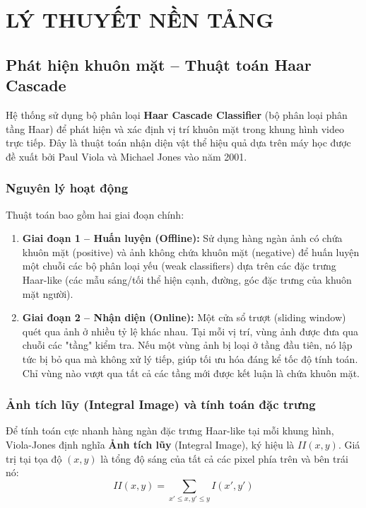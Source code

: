 \documentclass[12pt,a4paper]{article}
\begin{document}
\newpage

\section{LÝ THUYẾT NỀN TẢNG}

\subsection{Phát hiện khuôn mặt – Thuật toán Haar Cascade}
Hệ thống sử dụng bộ phân loại \textbf{Haar Cascade Classifier} (bộ phân loại phân tầng Haar) để phát hiện và xác định vị trí khuôn mặt trong khung hình video trực tiếp. Đây là thuật toán nhận diện vật thể hiệu quả dựa trên máy học được đề xuất bởi Paul Viola và Michael Jones vào năm 2001.

\subsubsection{Nguyên lý hoạt động}
Thuật toán bao gồm hai giai đoạn chính:
\begin{enumerate}
    \item \textbf{Giai đoạn 1 – Huấn luyện (Offline):} Sử dụng hàng ngàn ảnh có chứa khuôn mặt (positive) và ảnh không chứa khuôn mặt (negative) để huấn luyện một chuỗi các bộ phân loại yếu (weak classifiers) dựa trên các đặc trưng Haar-like (các mẫu sáng/tối thể hiện cạnh, đường, góc đặc trưng của khuôn mặt người).
    \item \textbf{Giai đoạn 2 – Nhận diện (Online):} Một cửa sổ trượt (sliding window) quét qua ảnh ở nhiều tỷ lệ khác nhau. Tại mỗi vị trí, vùng ảnh được đưa qua chuỗi các "tầng" kiểm tra. Nếu một vùng ảnh bị loại ở tầng đầu tiên, nó lập tức bị bỏ qua mà không xử lý tiếp, giúp tối ưu hóa đáng kể tốc độ tính toán. Chỉ vùng nào vượt qua tất cả các tầng mới được kết luận là chứa khuôn mặt.
\end{enumerate}

\subsubsection{Ảnh tích lũy (Integral Image) và tính toán đặc trưng}
Để tính toán cực nhanh hàng ngàn đặc trưng Haar-like tại mỗi khung hình, Viola-Jones định nghĩa \textbf{Ảnh tích lũy} (Integral Image), ký hiệu là $II(x,y)$. Giá trị tại tọa độ $(x,y)$ là tổng độ sáng của tất cả các pixel phía trên và bên trái nó:
\begin{equation}
    II(x,y) = \sum_{x' \le x, y' \le y} I(x', y')
\end{equation}
\end{document}
